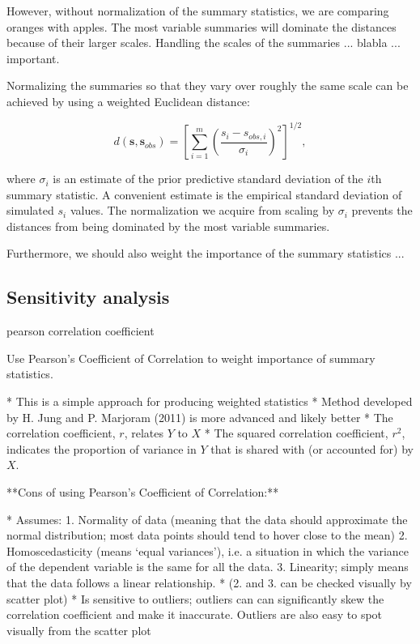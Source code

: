 However, without normalization of the summary statistics, we are comparing oranges with apples. The most variable summaries will dominate the distances because of their larger scales. Handling the scales of the summaries ... blabla ... important.  

Normalizing the summaries so that they vary over roughly the same scale can be achieved by using a weighted Euclidean distance: 

$$ d \left(\mathbf{s}, \mathbf{s}_{obs} \right) = \left[ \sum_{i=1}^m \left( \frac{s_i - s_{obs, i}}{\sigma_i} \right)^2 \right]^{1/2},$$

where $\sigma_i$ is an estimate of the prior predictive standard deviation of the $i$th summary statistic. A convenient estimate is the empirical standard deviation of simulated $s_i$ values. The normalization we acquire from scaling by $\sigma_i$ prevents the distances from being dominated by the most variable summaries.  

Furthermore, we should also weight the importance of the summary statistics ...

\subsection{Sensitivity analysis} 

pearson correlation coefficient

Use Pearson's Coefficient of Correlation to weight importance of summary statistics.

* This is a simple approach for producing weighted statistics 
    * Method developed by H. Jung and P. Marjoram (2011) is more advanced and likely better
* The correlation coefficient, $r$, relates $Y$ to $X$ 
* The squared correlation coefficient, $r^2$, indicates the proportion of variance in $Y$ that is shared with (or accounted for) by $X$.

**Cons of using Pearson's Coefficient of Correlation:**

* Assumes:
    1. Normality of data (meaning that the data should approximate the normal distribution; most data points should tend to hover close to the mean)
    2. Homoscedasticity (means ‘equal variances’), i.e. a situation in which the variance of the dependent variable is the same for all the data.
    3. Linearity; simply means that the data follows a linear relationship. 
* (2. and 3. can be checked visually by scatter plot)
* Is sensitive to outliers; outliers can can significantly skew the correlation coefficient and make it inaccurate. Outliers are also easy to spot visually from the scatter plot


